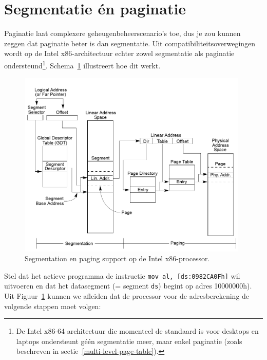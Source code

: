 \section{Segmentatie \'en paginatie}

Paginatie laat complexere geheugenbeheerscenario's toe, dus je zou kunnen zeggen dat paginatie beter is dan segmentatie. Uit compatibiliteitsoverwegingen wordt op de Intel x86-architectuur echter zowel segmentatie als paginatie ondersteund\footnote{De Intel x86-64 architectuur die momenteel de standaard is voor desktops en laptops ondersteunt g\'e\'en segmentatie meer, maar enkel paginatie (zoals beschreven in sectie~\ref{multi-level-page-table}).}. Schema~\ref{segmentation_paging} illustreert hoe dit werkt.

\begin{figure}
\begin{center}
\includegraphics[width=110mm]{images/segmentation_paging.png}
\end{center}
\caption{Segmentation en paging support op de Intel x86-processor.}
\label{segmentation_paging}
\end{figure}

Stel dat het actieve programma de instructie \texttt{mov al, [ds:0982CA0Fh]} wil uitvoeren en dat het datasegment (= segment \texttt{ds}) begint op adres 10000000h). Uit Figuur~\ref{segmentation_paging} kunnen we afleiden dat de processor voor de adresberekening de volgende stappen moet volgen:

